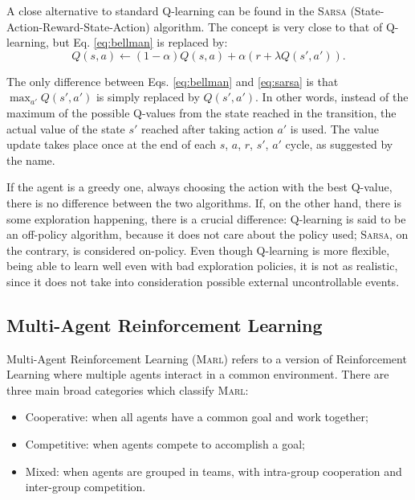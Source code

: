 \documentclass[a4paper, 12pt]{article}
\numberwithin{equation}{section}
\begin{document}
A close alternative to standard Q-learning can be found in the \textsc{Sarsa} (State-Action-Reward-State-Action) algorithm. The concept is very close to that of Q-learning, but Eq. \eqref{eq:bellman} is replaced by:
\begin{equation}\label{eq:sarsa}
	Q\left(s,a\right)\leftarrow \left(1-\alpha\right)Q\left(s,a\right)+\alpha\left(r+\lambda Q\left(s',a'\right)\right).
\end{equation}

The only difference between Eqs. \eqref{eq:bellman} and \eqref{eq:sarsa} is that $\max_{a'}Q\left(s',a'\right)$ is simply replaced by $Q\left(s',a'\right)$. In other words, instead of the maximum of the possible Q-values from the state reached in the transition, the actual value of the state $s'$ reached after taking action $a'$ is used. The value update takes place once at the end of each $s$, $a$, $r$, $s'$, $a'$ cycle, as suggested by the name.

If the agent is a greedy one, always choosing the action with the best Q-value, there is no difference between the two algorithms. If, on the other hand, there is some exploration happening, there is a crucial difference: Q-learning is said to be an off-policy algorithm, because it does not care about the policy used; \textsc{Sarsa}, on the contrary, is considered on-policy. Even though Q-learning is more flexible, being able to learn well even with bad exploration policies, it is not as realistic, since it does not take into consideration possible external uncontrollable events.


\subsection[Multi-Agent Reinforcement Learning]{Multi-Agent Reinforcement Learning \cite{multi-agent-rl}}

Multi-Agent Reinforcement Learning (\textsc{Marl}) refers to a version of Reinforcement Learning where multiple agents interact in a common environment. There are three main broad categories which classify \textsc{Marl}:
\begin{itemize}
	\item Cooperative: when all agents have a common goal and work together;
	\item Competitive: when agents compete to accomplish a goal;
	\item Mixed: when agents are grouped in teams, with intra-group cooperation and inter-group competition.
\end{itemize}
\end{document}
